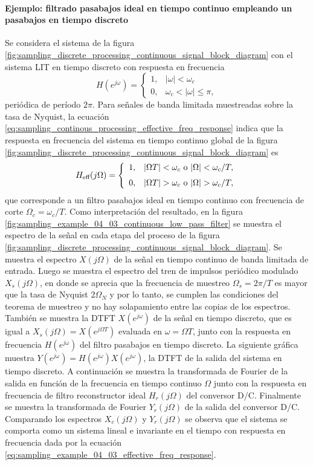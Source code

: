 \documentclass[a4paper]{report}
\begin{document}
\paragraph{Ejemplo: filtrado pasabajos ideal en tiempo continuo empleando un pasabajos en tiempo discreto} Se considera el sistema de la figura \ref{fig:sampling_discrete_processing_continuous_signal_block_diagram} con el sistema LIT en tiempo discreto con respuesta en frecuencia
\[
 H(e^{j\omega})=
 \left\{
 \begin{array}{ll}
  1, & |\omega|<\omega_c\\
  0, & \omega_c<|\omega|\leq\pi,
 \end{array}
 \right.
\]
periódica de período \(2\pi\). Para señales de banda limitada muestreadas sobre la tasa de Nyquist, la ecuación \ref{eq:sampling_continous_processing_effective_freq_response} indica que la respuesta en frecuencia del sistema en tiempo continuo global de la figura \ref{fig:sampling_discrete_processing_continuous_signal_block_diagram} es
\begin{equation}\label{eq:sampling_example_04_03_effective_freq_response}
  H_\textrm{eff}(j\Omega)
 =\left\{
  \begin{array}{ll}
   1, & |\Omega T|<\omega_c\textrm{ o }|\Omega|<\omega_c/T,\\[\medskipamount]
   0, & |\Omega T|>\omega_c\textrm{ o }|\Omega|>\omega_c/T,
  \end{array}
  \right.  
\end{equation}
que corresponde a un filtro pasabajos ideal en tiempo continuo con frecuencia de corte \(\Omega_c=\omega_c/T\).
Como interpretación del resultado, en la figura \ref{fig:sampling_example_04_03_continuous_low_pass_filter} se muestra el espectro de la señal en cada etapa del proceso de la figura \ref{fig:sampling_discrete_processing_continuous_signal_block_diagram}. Se muestra el espectro \(X(j\Omega)\) de la señal en tiempo continuo de banda limitada de entrada. Luego se muestra el espectro del tren de impulsos periódico modulado \(X_s(j\Omega)\), en donde se aprecia que la frecuencia de muestreo \(\Omega_s=2\pi/T\) es mayor que la tasa de Nyquist \(2\Omega_N\) y por lo tanto, se cumplen las condiciones del teorema de muestreo y no hay solapamiento entre las copias de los espectros. También se muestra la DTFT \(X(e^{j\omega})\) de la señal en tiempo discreto, que es igual a \(X_s(j\Omega)=X(e^{j\Omega T})\) evaluada en \(\omega=\Omega T\), junto con la respuesta en frecuencia \(H(e^{j\omega})\) del filtro pasabajos en tiempo discreto. La siguiente gráfica muestra \(Y(e^{j\omega})=H(e^{j\omega})X(e^{j\omega})\), la DTFT de la salida del sistema en tiempo discreto. A continuación se muestra la transformada de Fourier de la salida en función de la frecuencia en tiempo continuo \(\Omega\) junto con la respuesta en frecuencia de filtro reconstructor ideal \(H_r(j\Omega)\)  del conversor D/C. Finalmente se muestra la transformada de Fourier \(Y_r(j\Omega)\) de la salida del conversor D/C. Comparando los espectros \(X_c(j\Omega)\) y \(Y_r(j\Omega)\) se observa que el sistema se comporta como un sistema lineal e invariante en el tiempo con respuesta en frecuencia dada por la ecuación \ref{eq:sampling_example_04_03_effective_freq_response}.
\end{document}
